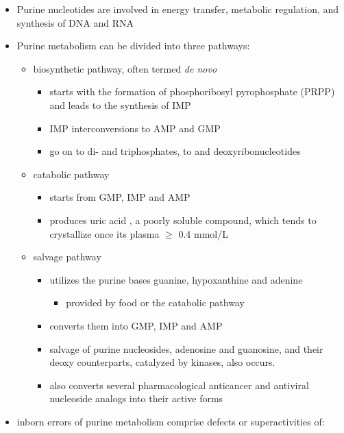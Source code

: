 \documentclass{scrartcl}
\begin{document}
\begin{itemize}
\item Purine nucleotides are involved in energy transfer, metabolic
regulation, and synthesis of DNA and RNA
\item Purine metabolism can be divided into three pathways:
\begin{itemize}
\item biosynthetic pathway, often termed \emph{de novo}
\begin{itemize}
\item starts with the formation of phosphoribosyl pyrophosphate (PRPP)
and leads to the synthesis of IMP
\item IMP interconversions to AMP and GMP
\item go on to di- and triphosphates, to and deoxyribonucleotides
\end{itemize}
\item catabolic pathway
\begin{itemize}
\item starts from GMP, IMP and AMP
\item produces uric acid , a poorly soluble compound, which tends to
crystallize once its plasma \(\ge\) 0.4 mmol/L
\end{itemize}
\item salvage pathway
\begin{itemize}
\item utilizes the purine bases guanine, hypoxanthine and adenine
\begin{itemize}
\item provided by food or the catabolic pathway
\end{itemize}
\item converts them into GMP, IMP and AMP
\item salvage of purine nucleosides, adenosine and guanosine, and
their deoxy counterparts, catalyzed by kinases, also occurs.
\item also converts several pharmacological anticancer and antiviral
nucleoside analogs into their active forms
\end{itemize}
\end{itemize}

\item inborn errors of purine metabolism comprise defects or
superactivities of:


\end{itemize}
\end{document}
